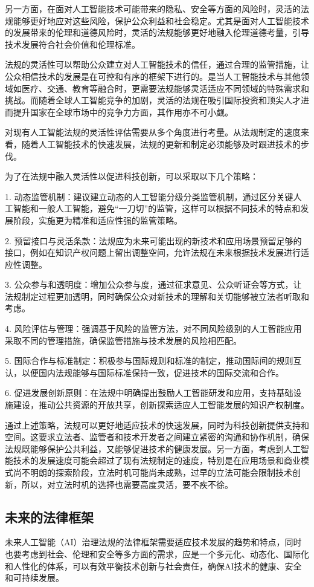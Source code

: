 另一方面，在面对人工智能技术可能带来的隐私、安全等方面的风险时，灵活的法规能够更好地应对这些风险，保护公众利益和社会稳定。尤其是面对人工智能技术的发展带来的伦理和道德风险时，灵活的法规能够更好地融入伦理道德考量，引导技术发展符合社会价值和伦理标准。

法规的灵活性可以帮助公众建立对人工智能技术的信任，通过合理的监管措施，让公众相信技术的发展是在可控和有序的框架下进行的。是当人工智能技术与其他领域如医疗、交通、教育等融合时，更需要法规能够灵活适应不同领域的特殊需求和挑战。而随着全球人工智能竞争的加剧，灵活的法规在吸引国际投资和顶尖人才进而提升国家在全球市场中的竞争力方面，其作用亦不可小觑。

对现有人工智能法规的灵活性评估需要从多个角度进行考量。从法规制定的速度来看，随着人工智能技术的快速发展，法规的更新和制定必须能够及时跟进技术的步伐。

为了在法规中融入灵活性以促进科技创新，可以采取以下几个策略：

1. 动态监管机制：建议建立动态的人工智能分级分类监管机制，通过区分关键人工智能和一般人工智能，避免“一刀切”的监管，这样可以根据不同技术的特点和发展阶段，实施更为精准和适应性强的监管策略。

2. 预留接口与灵活条款：法规应为未来可能出现的新技术和应用场景预留足够的接口，例如在知识产权问题上留出调整空间，允许法规在未来根据技术发展进行适应性调整。

3. 公众参与和透明度：增加公众参与度，通过征求意见、公众听证会等方式，让法规制定过程更加透明，同时确保公众对新技术的理解和关切能够被立法者听取和考虑。

4. 风险评估与管理：强调基于风险的监管方法，对不同风险级别的人工智能应用采取不同的管理措施，确保监管措施与技术发展的风险相匹配。

5. 国际合作与标准制定：积极参与国际规则和标准的制定，推动国际间的规则互认，以便国内法规能够与国际标准保持一致，促进技术的国际交流和合作。

6. 促进发展创新原则：在法规中明确提出鼓励人工智能研发和应用，支持基础设施建设，推动公共资源的开放共享，创新探索适应人工智能发展的知识产权制度。

通过上述策略，法规可以更好地适应技术的快速发展，同时为科技创新提供支持和空间。这要求立法者、监管者和技术开发者之间建立紧密的沟通和协作机制，确保法规既能够保护公共利益，又能够促进技术的健康发展。另一方面，考虑到人工智能技术的发展速度可能会超过了现有法规制定的速度，特别是在应用场景和商业模式尚不明朗的探索阶段，立法时机可能尚未成熟，过早的立法可能会限制技术创新，所以，对立法时机的选择也需要高度灵活，要不疾不徐。

\subsection{未来的法律框架}
未来人工智能（AI）治理法规的法律框架需要适应技术发展的趋势和特点，同时也要考虑到社会、伦理和安全等多方面的需求，应是一个多元化、动态化、国际化和人性化的体系，可以有效平衡技术创新与社会责任，确保AI技术的健康、安全和可持续发展。

